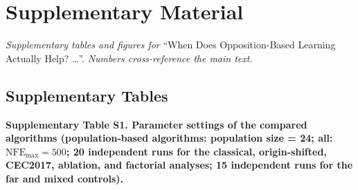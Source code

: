 \documentclass[
  9pt,
]{extarticle}
\author{}
\date{}
\begin{document}
\section{Supplementary Material}\label{supplementary-material}

\emph{Supplementary tables and figures for} ``When Does Opposition-Based
Learning Actually Help? \ldots''. \emph{Numbers cross-reference the main
text.}

\subsection{Supplementary Tables}\label{supplementary-tables}

\textbf{Supplementary Table S1. Parameter settings of the compared
algorithms (population-based algorithms: population size = 24; all:
\(\mathrm{NFE}_{\max} = 500\); 20 independent runs for the classical,
origin-shifted, CEC2017, ablation, and factorial analyses; 15
independent runs for the far and mixed controls).}
\end{document}
